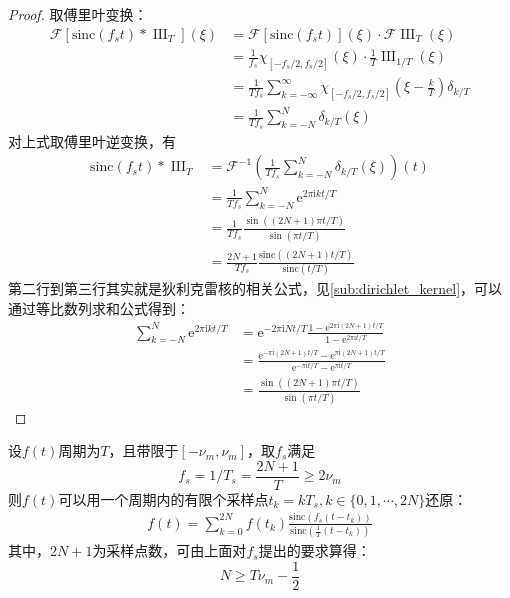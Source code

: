 \documentclass{ctexbook}
\newcommand{\shah}{\operatorname{III}}
\begin{document}
\begin{proof}
    取傅里叶变换：
\begin{align*}
    \mathcal{F} \left[\text{sinc}\left(f_s t\right)*\shah_T\right](\xi)&=\mathcal{F} \left[\text{sinc}\left(f_s t\right)\right](\xi)\cdot\mathcal{F} \shah_T(\xi)\\
    &=\frac{1}{f_s}\chi_{[-f_s/2,f_s/2]}(\xi)\cdot\frac{1}{T}\shah_{1/T}(\xi)\\
    &=\frac{1}{T f_s}\sum_{k=-\infty}^{\infty}\chi_{[-f_s/2,f_s/2]}\left(\xi-\frac{k}{T}\right)\delta_{k/T}\\
    &=\frac{1}{T f_s}\sum_{k=-N}^{N}\delta_{k/T}(\xi)
\end{align*}
对上式取傅里叶逆变换，有
\begin{align*}
    \text{sinc}\left(f_s t\right)*\shah_T&=\mathcal{F} ^{-1}\left(\frac{1}{T f_s}\sum_{k=-N}^{N}\delta_{k/T}(\xi)\right)(t)\\
    &=\frac{1}{T f_s}\sum_{k=-N}^{N}\mathrm{e}^{2\pi \mathrm{i}kt/T}\\
    &=\frac{1}{T f_s}\frac{\sin\left((2N+1)\pi t/T\right)}{\sin\left(\pi t/T\right)}\\
    &=\frac{2N+1}{T f_s}\frac{\text{sinc}\left((2N+1)t/T\right)}{\text{sinc}\left(t/T\right)}
\end{align*}
第二行到第三行其实就是狄利克雷核的相关公式，见\ref{sub:dirichlet_kernel}，可以通过等比数列求和公式得到：\begin{align*}
    \sum_{k=-N}^{N}\mathrm{e}^{2\pi \mathrm{i}kt/T}&=\mathrm{e}^{-2\pi \mathrm{i}Nt/T}\frac{1-\mathrm{e}^{2\pi \mathrm{i}(2N+1)t/T}}{1-\mathrm{e}^{2\pi \mathrm{i}t/T}}\\
    &=\frac{\mathrm{e}^{-\pi \mathrm{i}(2N+1)t/T}-\mathrm{e}^{\pi \mathrm{i}(2N+1)t/T}}{\mathrm{e}^{-\pi \mathrm{i}t/T}-\mathrm{e}^{\pi \mathrm{i}t/T}}\\
    &=\frac{\sin\left((2N+1)\pi t/T\right)}{\sin\left(\pi t/T\right)}
\end{align*}
\end{proof}
\begin{proposition}[有限采样公式]
    设$f(t)$周期为$T$，且带限于$[-\nu_m,\nu_m]$，取$f_s$满足
    $$f_s=1/T_s=\frac{2N+1}{T}\geq 2\nu_m$$
    则$f(t)$可以用一个周期内的有限个采样点$t_k=kT_s,k\in\{0,1,\cdots,2N\}$还原：
    \begin{align*}
        f(t)=\sum_{k=0}^{2N}f(t_k)\frac{\text{sinc}\left(f_s(t-t_k)\right)}{\text{sinc}\left(\frac{1}{T}(t-t_k)\right)}
    \end{align*}
    其中，$2N+1$为采样点数，可由上面对$f_s$提出的要求算得：
    $$N\geq T\nu_m-\dfrac{1}{2}$$
\end{proposition}
\end{document}
